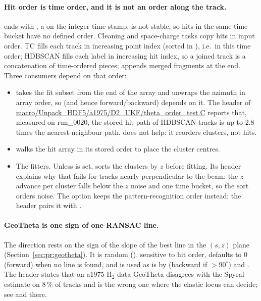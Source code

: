 \paragraph{Hit order is time order, and it is not an order along the track.}  ends with
, a  on the integer time stamp.  is not
stable, so hits in the same time bucket have no defined order. Cleaning and space-charge tasks copy hits in input order. TC fills each track in increasing point
index (sorted in ), i.e.\ in this time order; HDBSCAN fills each label
in increasing hit index, so a joined track is a concatenation of time-ordered pieces;  appends
merged fragments at the end. Three consumers depend on that order:
\begin{itemize}
\item {} takes the fit subset from the end of the array and unwraps the
  azimuth in array order, so  (and hence forward/backward) depends on it. The header of
  \url{macro/Unpack_HDF5/a1975/D2_UKF/theta_order_test.C} reports that, measured on run\_0020, the stored hit
  path of HDBSCAN tracks is up to 2.8 times the nearest-neighbour path.  does
  not help: it reorders clusters, not hits.
\item {} walks the hit array in its stored order to place the cluster centres.
\item The fitters. Unless  is set,  sorts the clusters
  by $z$ before fitting. Its header explains why that fails for tracks nearly perpendicular
  to the beam: the $z$ advance per cluster falls below the $z$ noise and one time bucket, so the sort orders
  noise. The option keeps the pattern-recognition order instead; the header pairs it with
  .
\end{itemize}

\paragraph{GeoTheta is one sign of one RANSAC line.} The direction rests on the sign of the slope of the
best line in the $(s,z)$ plane (Section~\ref{sec:pr:geotheta}). It is random (), sensitive
to hit order, defaults to $0$ (forward) when no line is found, and is used as is by 
(backward if $>90^\circ$) and . The  header states that on a1975 H$_2$
data GeoTheta disagrees with the Spyral estimate on 8\,\% of tracks and is the wrong one where the elastic
locus can decide; see  and  there.

